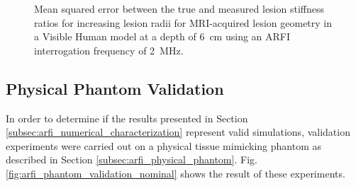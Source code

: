 			\begin{figure}[!htb]
				\centering
				\caption[ARFI imaging-acquired lesion stiffness mean squared error related to MRI-acquired lesion size in a Visible Human model]{Mean squared error between the true and measured lesion stiffness ratios for increasing lesion radii for MRI-acquired lesion geometry in a Visible Human model at a depth of \SI{6}{\cm} using an ARFI interrogation frequency of \SI{2}{\MHz}.}
				\label{fig:arfi_human_radius_mse}
			\end{figure}

		\FloatBarrier
		\subsection{Physical Phantom Validation}
		\label{subsec:arfi_validation_results}
			In order to determine if the results presented in Section \ref{subsec:arfi_numerical_characterization} represent valid simulations, validation experiments were carried out on a physical tissue mimicking phantom as described in Section \ref{subsec:arfi_physical_phantom}. Fig. \ref{fig:arfi_phantom_validation_nominal} shows the result of these experiments.

